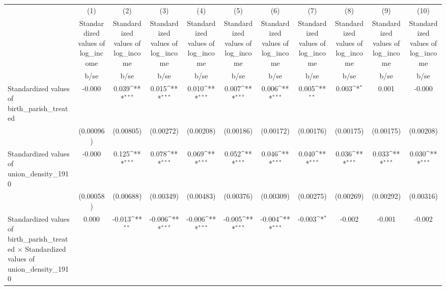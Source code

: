 {
\def\sym#1{\ifmmode^{#1}\else\(^{#1}\)\fi}
\begin{tabular}{l*{10}{c}}
\hline\hline
                    &\multicolumn{1}{c}{(1)}&\multicolumn{1}{c}{(2)}&\multicolumn{1}{c}{(3)}&\multicolumn{1}{c}{(4)}&\multicolumn{1}{c}{(5)}&\multicolumn{1}{c}{(6)}&\multicolumn{1}{c}{(7)}&\multicolumn{1}{c}{(8)}&\multicolumn{1}{c}{(9)}&\multicolumn{1}{c}{(10)}\\
                    &\multicolumn{1}{c}{Standardized values of log\_income}&\multicolumn{1}{c}{Standardized values of log\_income}&\multicolumn{1}{c}{Standardized values of log\_income}&\multicolumn{1}{c}{Standardized values of log\_income}&\multicolumn{1}{c}{Standardized values of log\_income}&\multicolumn{1}{c}{Standardized values of log\_income}&\multicolumn{1}{c}{Standardized values of log\_income}&\multicolumn{1}{c}{Standardized values of log\_income}&\multicolumn{1}{c}{Standardized values of log\_income}&\multicolumn{1}{c}{Standardized values of log\_income}\\
                    &        b/se         &        b/se         &        b/se         &        b/se         &        b/se         &        b/se         &        b/se         &        b/se         &        b/se         &        b/se         \\
\hline
Standardized values of birth\_parish\_treated&      -0.000         &       0.039\sym{***}&       0.015\sym{***}&       0.010\sym{***}&       0.007\sym{***}&       0.006\sym{***}&       0.005\sym{**} &       0.003\sym{*}  &       0.001         &      -0.000         \\
                    &   (0.00096)         &   (0.00805)         &   (0.00272)         &   (0.00208)         &   (0.00186)         &   (0.00172)         &   (0.00176)         &   (0.00175)         &   (0.00175)         &   (0.00208)         \\
Standardized values of union\_density\_1910&      -0.000         &       0.125\sym{***}&       0.078\sym{***}&       0.069\sym{***}&       0.052\sym{***}&       0.046\sym{***}&       0.040\sym{***}&       0.036\sym{***}&       0.033\sym{***}&       0.030\sym{***}\\
                    &   (0.00058)         &   (0.00688)         &   (0.00349)         &   (0.00483)         &   (0.00376)         &   (0.00309)         &   (0.00275)         &   (0.00269)         &   (0.00292)         &   (0.00316)         \\
Standardized values of birth\_parish\_treated $\times$ Standardized values of union\_density\_1910&       0.000         &      -0.013\sym{**} &      -0.006\sym{***}&      -0.006\sym{***}&      -0.005\sym{***}&      -0.004\sym{***}&      -0.003\sym{*}  &      -0.002         &      -0.001         &      -0.002         \\

\end{tabular}}
